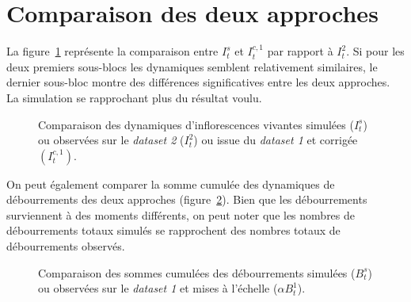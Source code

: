 \documentclass[a4paper, 11pt]{article}
\begin{document}
\section{Comparaison des deux approches}

La figure~\ref{comp} représente la comparaison entre $I_t^s$ et $I_t^{c, 1}$ par rapport à $I_t^2$. Si pour les deux premiers sous-blocs les dynamiques semblent relativement similaires, le dernier sous-bloc montre des différences significatives entre les deux approches. La simulation se rapprochant plus du résultat voulu.

%  
% 

\begin{figure}[ht]
 \centering
 \caption{Comparaison des dynamiques d'inflorescences vivantes simulées ($I_t^s$) ou observées sur le \textit{dataset 2} ($I_t^2$) ou issue du \textit{dataset 1} et corrigée $(I_t^{c,1})$.}
 \label{comp}
\end{figure}


On peut également comparer la somme cumulée des dynamiques de débourrements des deux approches (figure~\ref{burst}). Bien que les débourrements surviennent à des moments différents, on peut noter que les nombres de débourrements totaux simulés se rapprochent des nombres totaux de débourrements observés. 

%  
% 

\begin{figure}[ht]
 \centering
 \caption{Comparaison des sommes cumulées des débourrements simulées ($B_t^s$) ou observées sur le \textit{dataset 1} et mises à l'échelle ($\alpha B_t^{1}$).}
 \label{burst}
\end{figure}

\clearpage
 

\end{document}
